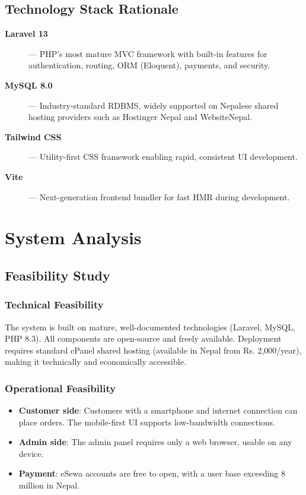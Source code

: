 \documentclass[12pt,a4paper]{report}
\begin{document}
\section{Technology Stack Rationale}

\begin{description}
  \item[\textbf{Laravel 13}] — PHP's most mature MVC framework with built-in features for authentication, routing, ORM (Eloquent), payments, and security.
  \item[\textbf{MySQL 8.0}] — Industry-standard RDBMS, widely supported on Nepalese shared hosting providers such as Hostinger Nepal and WebsiteNepal.
  \item[\textbf{Tailwind CSS}] — Utility-first CSS framework enabling rapid, consistent UI development.
  \item[\textbf{Vite}] — Next-generation frontend bundler for fast HMR during development.
\end{description}

\chapter{System Analysis}

\section{Feasibility Study}

\subsection{Technical Feasibility}
The system is built on mature, well-documented technologies (Laravel, MySQL, PHP 8.3). All components are open-source and freely available. Deployment requires standard cPanel shared hosting (available in Nepal from Rs. 2,000/year), making it technically and economically accessible.

\subsection{Operational Feasibility}
\begin{itemize}
  \item \textbf{Customer side}: Customers with a smartphone and internet connection can place orders. The mobile-first UI supports low-bandwidth connections.
  \item \textbf{Admin side}: The admin panel requires only a web browser, usable on any device.
  \item \textbf{Payment}: eSewa accounts are free to open, with a user base exceeding 8 million in Nepal.
\end{itemize}
\end{document}

